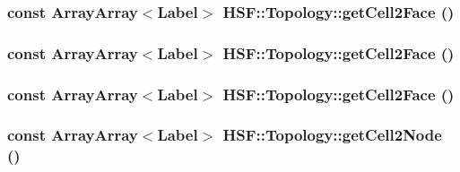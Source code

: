 \label{classHSF_1_1Topology_a5ae4e7f4f97d8946a3319a642d0b37b9}
\hypertarget{classHSF_1_1Topology_af95390ff895b1f2f0f419c944627a02f}{
\subsubsection[{getCell2Face}]{\setlength{\rightskip}{0pt plus 5cm}const {\bf ArrayArray}$<${\bf Label}$>$ HSF::Topology::getCell2Face ()}}
\label{classHSF_1_1Topology_af95390ff895b1f2f0f419c944627a02f}
\hypertarget{classHSF_1_1Topology_af95390ff895b1f2f0f419c944627a02f}{
\subsubsection[{getCell2Face}]{\setlength{\rightskip}{0pt plus 5cm}const {\bf ArrayArray}$<${\bf Label}$>$ HSF::Topology::getCell2Face ()}}
\label{classHSF_1_1Topology_af95390ff895b1f2f0f419c944627a02f}
\hypertarget{classHSF_1_1Topology_af95390ff895b1f2f0f419c944627a02f}{
\subsubsection[{getCell2Face}]{\setlength{\rightskip}{0pt plus 5cm}const {\bf ArrayArray}$<${\bf Label}$>$ HSF::Topology::getCell2Face ()}}
\label{classHSF_1_1Topology_af95390ff895b1f2f0f419c944627a02f}
\hypertarget{classHSF_1_1Topology_a4773996f5f708d964b87256318266497}{
\subsubsection[{getCell2Node}]{\setlength{\rightskip}{0pt plus 5cm}const {\bf ArrayArray}$<${\bf Label}$>$ HSF::Topology::getCell2Node ()}}
\label{classHSF_1_1Topology_a4773996f5f708d964b87256318266497}


